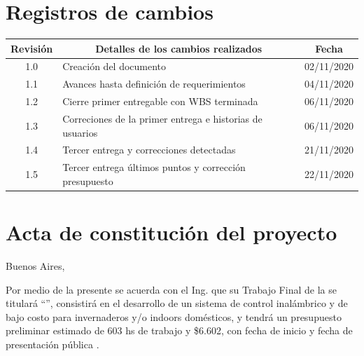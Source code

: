 \documentclass[11pt]{charter}
\begin{document}
\maketitle
\thispagestyle{empty}
\pagebreak


\thispagestyle{empty}
{\setlength{\parskip}{0pt}
\tableofcontents{}
}
\pagebreak


\section{Registros de cambios}
\label{sec:registro}


\begin{table}[ht]
\label{tab:registro}
\centering
\begin{tabularx}{\linewidth}{@{}|c|X|c|@{}}
\hline
\rowcolor[HTML]{C0C0C0} 
Revisión & \multicolumn{1}{c|}{\cellcolor[HTML]{C0C0C0}Detalles de los cambios realizados} & Fecha      \\ \hline
1.0      & Creación del documento                                          & 02/11/2020 \\ \hline
1.1      & Avances hasta definición de requerimientos                                          & 04/11/2020 \\ \hline
1.2      & Cierre primer entregable con WBS terminada
& 06/11/2020 \\ \hline
1.3      & Correciones de la primer entrega e historias de usuarios
& 06/11/2020 \\ \hline
1.4      & Tercer entrega y correcciones detectadas
& 21/11/2020 \\ \hline
1.5      & Tercer entrega últimos puntos y corrección presupuesto
& 22/11/2020 \\ \hline
\end{tabularx}
\end{table}

\pagebreak



\section{Acta de constitución del proyecto}
\label{sec:acta}

\begin{flushright}
Buenos Aires, \fechaInicioName
\end{flushright}

\vspace{2cm}

Por medio de la presente se acuerda con el Ing. \authorname\hspace{1px} que su Trabajo Final de la \degreename\hspace{1px} se titulará ``\ttitle'', consistirá en el desarrollo de un sistema de control inalámbrico y de bajo costo para invernaderos y/o indoors domésticos, y tendrá un presupuesto preliminar estimado de 603 hs de trabajo y {\$6.602}, con fecha de inicio \fechaInicioName\hspace{1px} y fecha de presentación pública \fechaFinalName.
\end{document}
